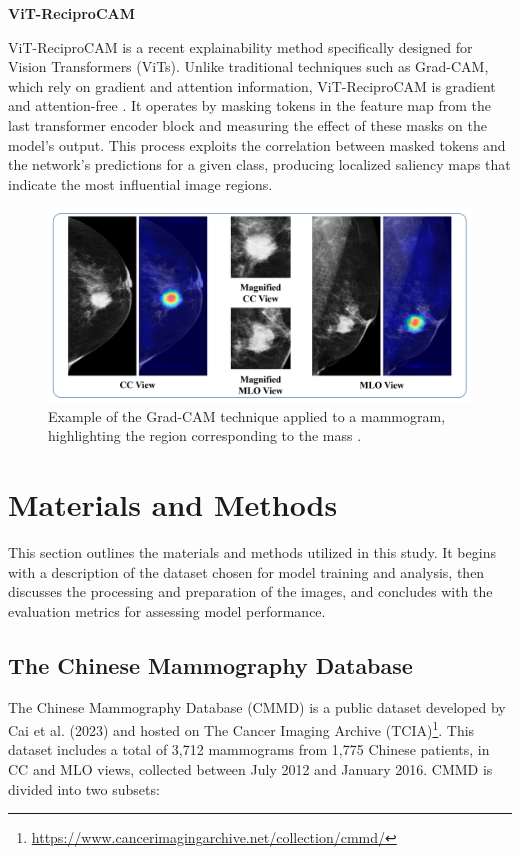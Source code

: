 \documentclass[a4paper,10pt]{book}
\begin{document}
\textbf{ViT-ReciproCAM}

ViT-ReciproCAM is a recent explainability method specifically designed for Vision Transformers (ViTs). Unlike traditional techniques such as Grad-CAM, which rely on gradient and attention information, ViT-ReciproCAM is gradient and attention-free \cite{byun_vit-reciprocam_2023}. It operates by masking tokens in the feature map from the last transformer encoder block and measuring the effect of these masks on the model’s output. This process exploits the correlation between masked tokens and the network’s predictions for a given class, producing localized saliency maps that indicate the most influential image regions.

\begin{figure}
    \centering
    \includegraphics[width=0.8\linewidth]{reports//assets/grad-cam.png}
    \caption[Grad-CAM example]{Example of the Grad-CAM technique applied to a mammogram, highlighting the region corresponding to the mass \cite{panambur_classification_2023}.}
    \label{fig:grad-cam-example}
\end{figure}

\chapter{Materials and Methods}

This section outlines the materials and methods utilized in this study. It begins with a description of the dataset chosen for model training and analysis, then discusses the processing and preparation of the images, and concludes with the evaluation metrics for assessing model performance.


\section{The Chinese Mammography Database}

The Chinese Mammography Database (CMMD) is a public dataset developed by Cai et al. (2023) \cite{cai_online_2023} and hosted on The Cancer Imaging Archive (TCIA)\footnote{\url{https://www.cancerimagingarchive.net/collection/cmmd/}}. This dataset includes a total of 3,712 mammograms from 1,775 Chinese patients, in CC and MLO views, collected between July 2012 and January 2016. CMMD is divided into two subsets:
\end{document}
